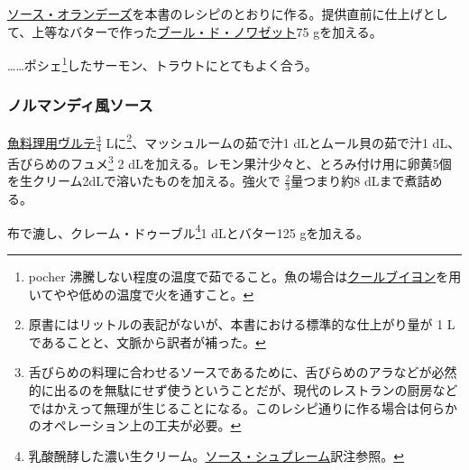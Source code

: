 \begin{recette}


\protect\hyperlink{sauce-hollandaise}{ソース・オランデーズ}を本書のレシピのとおりに作る。提供直前に仕上げとして、上等なバターで作った\protect\hyperlink{beurre-de-noisette}{ブール・ド・ノワゼット}75
gを加える。

\ldots{}\ldots{}ポシェ\footnote{pocher
  沸騰しない程度の温度で茹でること。魚の場合は\protect\hyperlink{court-bouillon-a}{クールブイヨン}を用いてやや低めの温度で火を通すこと。}したサーモン、トラウトにとてもよく合う。

\hypertarget{sauce-normande}{%
\subsubsection{ノルマンディ風ソース}\label{sauce-normande}}



\protect\hyperlink{veloute-de-poisson}{魚料理用ヴルテ}\(\frac{3}{4}\)
Lに\footnote{原書にはリットルの表記がないが、本書における標準的な仕上がり量が
  1 Lであることと、文脈から訳者が補った。}、マッシュルームの茹で汁1
dLとムール貝の茹で汁1 dL、舌びらめのフュメ\footnote{舌びらめの料理に合わせるソースであるために、舌びらめのアラなどが必然的に出るのを無駄にせず使うということだが、現代のレストランの厨房などではかえって無理が生じることになる。このレシピ通りに作る場合は何らかのオペレーション上の工夫が必要。}
2
dLを加える。レモン果汁少々と、とろみ付け用に卵黄5個を生クリーム2dLで溶いたものを加える。強火で
\(\frac{2}{3}\)量つまり約8 dLまで煮詰める。

布で漉し、クレーム・ドゥーブル\footnote{乳酸醗酵した濃い生クリーム。\protect\hyperlink{sauce-supreme}{ソース・シュプレーム}訳注参照。}1
dLとバター125 gを加える。


\end{recette}
